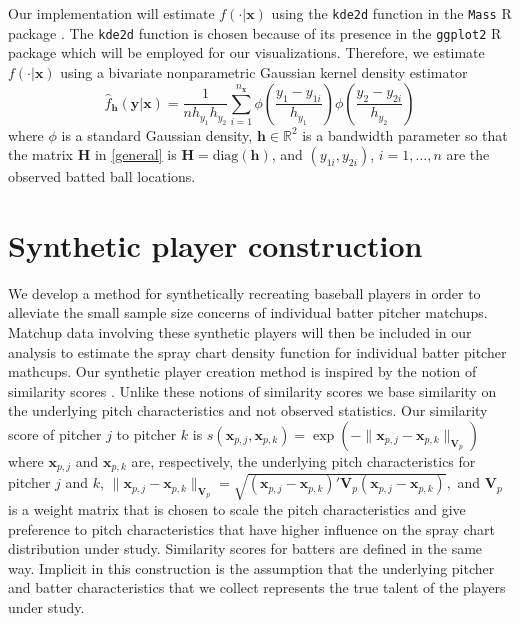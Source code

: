\documentclass[11pt]{article}
\newcommand{\R}{\mathbb{R}}
\newcommand{\Hbf}{\textbf{H}}
\newcommand{\V}{\textbf{V}}
\newcommand{\y}{\textbf{y}}
\newcommand{\x}{\textbf{x}}
\newcommand{\h}{\textbf{h}}
\begin{document}
Our implementation will estimate $f(\cdot|\x)$ using the \texttt{kde2d} function in the \texttt{Mass} R package \citep{MASS}. 
The \texttt{kde2d} function is chosen because of its presence 
in the \texttt{ggplot2} R package \citep{ggplot2} which will be employed for our visualizations. Therefore, we estimate $f(\cdot|\x)$ using a bivariate nonparametric Gaussian kernel density estimator
\begin{equation} \label{spraydens}
  \hat f_\h(\y|\x) = 
    \frac{1}{n h_{y_1}h_{y_2}}\sum_{i=1}^{n_\x} \phi\left(\frac{y_1 - y_{1i}}{h_{y_1}}\right)
      \phi\left(\frac{y_2 - y_{2i}}{h_{y_2}}\right)
\end{equation}
where $\phi$ is a standard Gaussian density, $\h \in \R^2$ is a bandwidth parameter so that the matrix $\Hbf$ in \eqref{general} is $\Hbf = \text{diag}(\h)$, and $(y_{1i},y_{2i})$, $i = 1,\ldots,n$ are the observed batted ball locations. 






\section{Synthetic player construction}

We develop a method for synthetically recreating baseball players in order to alleviate the small sample size concerns of individual batter pitcher matchups. Matchup data involving these synthetic players will then be included in our analysis to estimate the spray chart density function for individual batter pitcher mathcups. Our synthetic player creation method is %
inspired by the notion of similarity scores \citep{james1994politics, PECOTA}. Unlike these notions of similarity scores we base similarity on the underlying pitch characteristics and not observed statistics. Our similarity score of pitcher $j$ to pitcher $k$ is $s(\x_{p,j}, \x_{p,k}) = \exp(-\|\x_{p,j}-\x_{p,k}\|_{\V_p})$ where $\x_{p,j}$ and $\x_{p,k}$ are, respectively, the underlying pitch characteristics for pitcher $j$ and $k$,
$
 \|\x_{p,j}-\x_{p,k}\|_{\V_p} = \sqrt{(\x_{p,j}-\x_{p,k})'\V_p(\x_{p,j}-\x_{p,k})},
$ 
and $\V_p$ is a weight matrix that is chosen to scale the pitch characteristics and give preference to pitch characteristics that have higher influence on the spray chart distribution under study. Similarity scores for batters are defined in the same way. Implicit in this construction is the assumption that the underlying pitcher and batter characteristics that we collect represents the true talent of the players under study.
\end{document}
